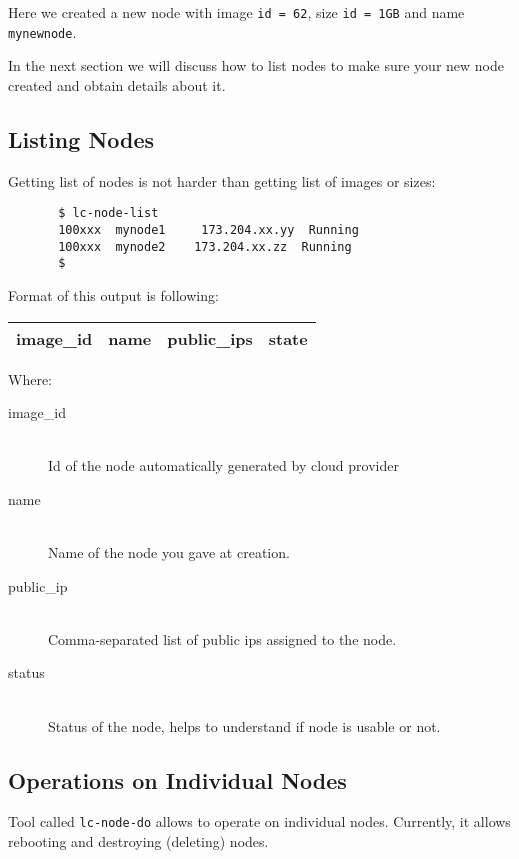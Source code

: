 \documentclass[a4paper]{report}
\begin{document}
       Here we created a new node with image \texttt{id = 62}, size
       \texttt{id = 1GB} and name \texttt{mynewnode}.

       In the next section we will discuss how to list nodes to make
       sure your new node created and obtain details about it.

       \subsection{Listing Nodes}
       Getting list of nodes is not harder than getting list of images
       or sizes:

       \begin{verbatim}
       $ lc-node-list
       100xxx  mynode1     173.204.xx.yy  Running
       100xxx  mynode2    173.204.xx.zz  Running
       $
       \end{verbatim}

       Format of this output is following:

       \begin{center}
         \begin{tabular}{ | c | c | c | c | }
           \hline
             image\_id & name & public\_ips & state \\
           \hline
         \end{tabular}
       \end{center}

       Where:

       \begin{description}
          \item[image\_id] \hfill \\
          Id of the node automatically generated by cloud provider
          \item[name] \hfill \\
          Name of the node you gave at creation.
          \item[public\_ip] \hfill \\
          Comma-separated list of public ips assigned to the node.
          \item[status] \hfill \\
          Status of the node, helps to understand if node is usable or not.
       \end{description}

       \subsection{Operations on Individual Nodes}
       Tool called \texttt{lc-node-do} allows to operate on individual nodes.
       Currently, it allows rebooting and destroying (deleting) nodes.
\end{document}
